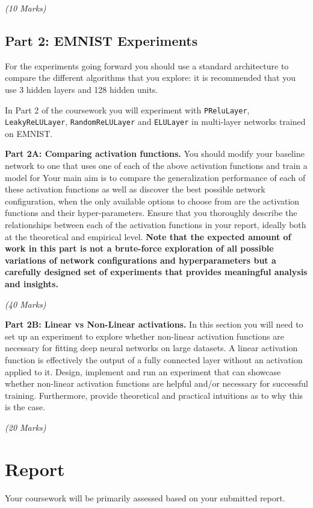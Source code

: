 \documentclass[11pt,]{article}
\begin{document}
\emph{(10 Marks)}

\subsection{Part 2: EMNIST Experiments}
\label{sec:part2}
For the experiments going forward you should use a standard architecture to compare the different algorithms that you explore: it is recommended that you use 3 hidden layers and 128 hidden units.

In Part 2 of the coursework you will experiment with \texttt{PReluLayer}, \texttt{LeakyReLULayer}, \texttt{RandomReLULayer} and \texttt{ELULayer} in multi-layer networks trained on EMNIST. 

\textbf{Part 2A: Comparing activation functions.}
You should modify your baseline network to one that uses one of each of the above activation functions and train a model for 
Your main aim is to compare the generalization performance of each of these activation functions as well as discover the best possible network configuration, when the only available options to choose from are the activation functions and their hyper-parameters. Ensure that you thoroughly describe the relationships between each of the activation functions in your report, ideally both at the theoretical and empirical level. \textbf{Note that the expected amount of work in this part is not a brute-force exploration of all possible variations of network configurations and hyperparameters but a carefully designed set of experiments that provides meaningful analysis and insights.}

\emph{(40 Marks)}

\textbf{Part 2B: Linear vs Non-Linear activations.}
In this section you will need to set up an experiment to explore whether non-linear activation functions are necessary for fitting deep neural networks on large datasets. A linear activation function is effectively the output of a fully connected layer without an activation applied to it. Design, implement and run an experiment that can showcase whether non-linear activation functions are helpful and/or necessary for successful training. Furthermore, provide theoretical and practical intuitions as to why this is the case.

\emph{(20 Marks)}
\section{Report}
\label{sec:report}
Your coursework will be primarily assessed based on your submitted report.
\end{document}
